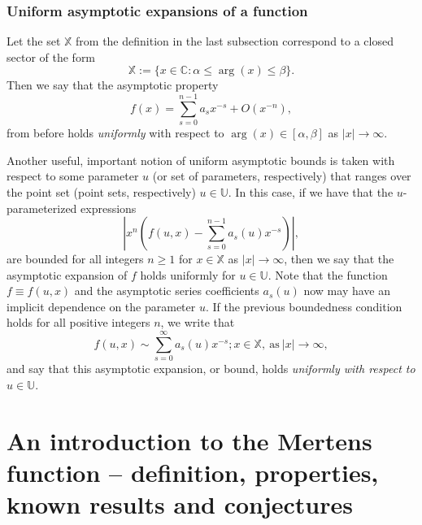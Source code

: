 \documentclass[11pt,reqno,a4letter]{article}
\numberwithin{figure}{section}
\numberwithin{table}{section}
\theoremstyle{plain}
\numberwithin{theorem}{section}
\theoremstyle{definition}
\begin{document}
\subsubsection{Uniform asymptotic expansions of a function} 

Let the set $\mathbb{X}$ from the definition in the last subsection correspond to a 
closed sector of the form 
$$\mathbb{X} := \{x \in \mathbb{C}: \alpha \leq \operatorname{arg}(x) \leq \beta\}.$$ 
Then we say that the asymptotic property 
\[
f(x) = \sum_{s=0}^{n-1} a_s x^{-s} + O(x^{-n}), 
\]
from before holds \emph{uniformly} with respect to $\operatorname{arg}(x) \in [\alpha, \beta]$ as 
$|x| \rightarrow \infty$. 

Another useful, important notion of uniform asymptotic bounds is taken with respect to some parameter $u$ 
(or set of parameters, respectively) that ranges over the point set (point sets, respectively) 
$u \in \mathbb{U}$. In this case, if we have that the $u$-parameterized expressions 
\[
\left\lvert x^n\left(f(u, x) - \sum_{s=0}^{n-1} a_s(u) x^{-s}\right) \right\rvert, 
\]
are bounded for all integers $n \geq 1$ for $x \in \mathbb{X}$ as $|x| \rightarrow \infty$, then we say that 
the asymptotic expansion of $f$ holds uniformly for $u \in \mathbb{U}$. Note that the function $f \equiv f(u, x)$ and the 
asymptotic series coefficients $a_s(u)$ now may have an implicit dependence on the parameter $u$. 
If the previous boundedness condition holds for all positive integers $n$, we write that 
\[
f(u, x) \sim \sum_{s=0}^{\infty} a_s(u) x^{-s}; x \in \mathbb{X}, \mathrm{\ as \ } |x| \rightarrow \infty, 
\]
and say that this asymptotic expansion, or bound, holds \emph{uniformly with respect to $u \in \mathbb{U}$}. 

\newpage
\section{An introduction to the Mertens function -- definition, properties, known results and conjectures} 
\label{subSection_MertensMxClassical_Intro} 
\end{document}
